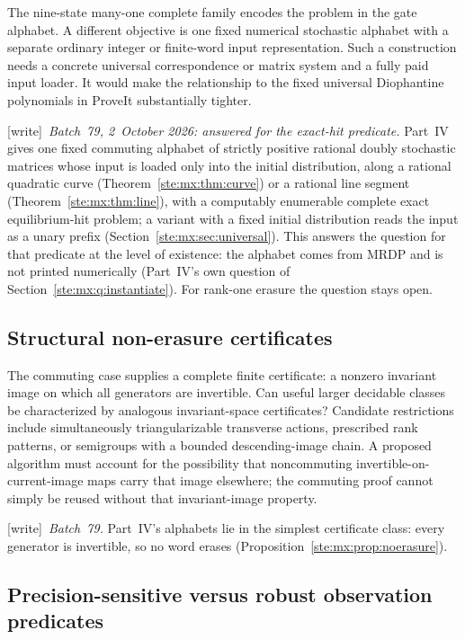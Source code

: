 \documentclass[11pt,letterpaper]{article}
\theoremstyle{definition}
\theoremstyle{remark}
\newcommand{\wtag}{\textup{[write]}}
\begin{document}
The nine-state many-one complete family encodes the problem in the gate alphabet.
A different objective is one fixed numerical stochastic alphabet with a separate
ordinary integer or finite-word input representation. Such a construction needs
a concrete universal correspondence or matrix system and a fully paid input
loader. It would make the relationship to the fixed universal Diophantine
polynomials in ProveIt substantially tighter.

\wtag\ \emph{Batch~79, 2~October 2026: answered for the exact-hit predicate.} Part~IV gives one fixed commuting alphabet of strictly positive rational doubly stochastic matrices whose input is loaded only into the initial distribution, along a rational quadratic curve (Theorem~\ref{ste:mx:thm:curve}) or a rational line segment (Theorem~\ref{ste:mx:thm:line}), with a computably enumerable complete exact equilibrium-hit problem; a variant with a fixed initial distribution reads the input as a unary prefix (Section~\ref{ste:mx:sec:universal}). This answers the question for that predicate at the level of existence: the alphabet comes from MRDP and is not printed numerically (Part~IV's own question of Section~\ref{ste:mx:q:instantiate}). For rank-one erasure the question stays open.

\subsection{Structural non-erasure certificates}\label{ste:ee:q:nonerasure}

The commuting case supplies a complete finite certificate: a nonzero invariant
image on which all generators are invertible. Can useful larger decidable
classes be characterized by analogous invariant-space certificates? Candidate
restrictions include simultaneously triangularizable transverse actions,
prescribed rank patterns, or semigroups with a bounded descending-image chain.
A proposed algorithm must account for the possibility that noncommuting
invertible-on-current-image maps carry that image elsewhere; the commuting
proof cannot simply be reused without that invariant-image property.

\wtag\ \emph{Batch~79.} Part~IV's alphabets lie in the simplest certificate class: every generator is invertible, so no word erases (Proposition~\ref{ste:mx:prop:noerasure}).

\subsection{Precision-sensitive versus robust observation predicates}\label{ste:ee:q:robust}
\end{document}
